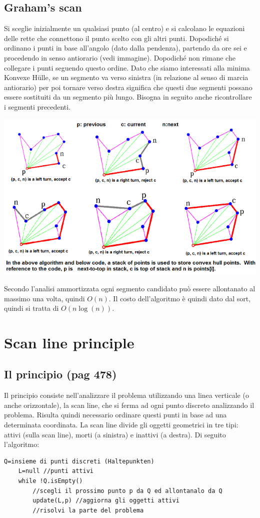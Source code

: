 \documentclass[a4paper]{book}
\newcommand{\lstIndent}{4}
\begin{document}
\subsection{Graham's scan}
Si sceglie inizialmente un qualsiasi punto (al centro) e si calcolano le equazioni delle rette che connettono il punto scelto con gli altri punti. Dopodiché si ordinano i punti in base all'angolo (dato dalla pendenza), partendo da ore sei e procedendo in senso antiorario (vedi immagine). Dopodiché non rimane che collegare i punti seguendo questo ordine. Dato che siamo interessati alla minima Konvexe Hülle, se un segmento va verso sinistra (in relazione al senso di marcia antiorario) per poi tornare verso destra significa che questi due segmenti possano essere sostituiti da un segmento più lungo. Bisogna in seguito anche ricontrollare i segmenti precedenti. 
\begin{center}
\includegraphics[scale=0.7]{Figures/graham.png}
\end{center}
Secondo l'analisi ammortizzata ogni segmento candidato può essere allontanato al massimo una volta, quindi $O(n)$. Il costo dell'algoritmo è quindi dato dal sort, quindi si tratta di $O(n\log (n))$.

\section{Scan line principle}
\subsection{Il principio (pag 478)}
Il principio consiste nell'analizzare il problema utilizzando una linea verticale (o anche orizzontale), la scan line, che si ferma ad ogni punto discreto analizzando il problema. Risulta quindi necessario ordinare questi punti in base ad una determinata coordinata. La scan line divide gli oggetti geometrici in tre tipi: attivi (sulla scan line), morti (a sinistra) e inattivi (a destra). Di seguito l'algoritmo:
\begin{lstlisting}[tabsize=\lstIndent]
	Q=insieme di punti discreti (Haltepunkten)
	L=null //punti attivi
	while !Q.isEmpty()
		//scegli il prossimo punto p da Q ed allontanalo da Q
		update(L,p) //aggiorna gli oggetti attivi
		//risolvi la parte del problema
\end{lstlisting}
\end{document}
